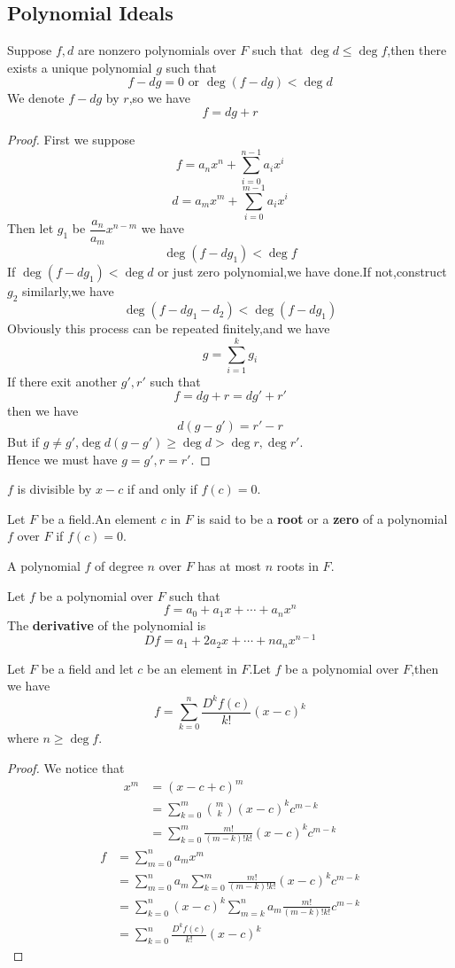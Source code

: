 \documentclass{article}
\begin{document}
\subsection{Polynomial Ideals}
\begin{thm}
	Suppose $f,d$ are nonzero polynomials over $F$ such that $\deg d\le\deg f$,then there exists a unique polynomial $g$ such that
	\[f-dg=0\text{ or }\deg(f-dg)<\deg d\]
	We denote $f-dg$ by $r$,so we have
	\[f=dg+r\]
\end{thm}
\begin{proof}
	First we suppose
	\[f=a_nx^n+\sum\limits_{i=0}^{n-1}a_ix^i\]
	\[d=a_mx^m+\sum\limits_{i=0}^{m-1}a_ix^i\]
	Then let $g_1$ be $\dfrac{a_n}{a_m}x^{n-m}$ we have
	\[\deg(f-dg_1)<\deg f\]
	If $\deg(f-dg_1)<\deg d$ or just zero polynomial,we have done.If not,construct $g_2$ similarly,we have
	\[\deg(f-dg_1-d_2)<\deg(f-dg_1)\]
	Obviously this process can be repeated finitely,and we have
	\[g=\sum\limits_{i=1}^kg_i\]
	If there exit another $g',r'$ such that
	\[f=dg+r=dg'+r'\]
	then we have
	\[d(g-g')=r'-r\]
	But if $g\neq g'$,$\deg d(g-g')\ge\deg d>\deg r,\deg r'$.\\
	Hence we must have $g=g',r=r'$.
\end{proof}
\begin{coro}
	$f$ is divisible by $x-c$ if and only if $f(c)=0$.
\end{coro}
\begin{dde}
	Let $F$ be a field.An element $c$ in $F$ is said to be a \textbf{root} or a \textbf{zero} of a polynomial $f$ over $F$ if $f(c)=0$.
\end{dde}
\begin{coro}
	A polynomial $f$ of degree $n$ over $F$ has at most $n$ roots in $F$. 
\end{coro}
\begin{dde}
	Let $f$ be a polynomial over $F$ such that
	\[f=a_0+a_1x+\cdots+a_nx^n\]
	The \textbf{derivative} of the polynomial is
	\[Df=a_1+2a_2x+\cdots+na_nx^{n-1}\]
\end{dde}
\begin{thm}
	Let $F$ be a field and let $c$ be an element in $F$.Let $f$ be a polynomial over $F$,then we have
	\[f=\sum\limits_{k=0}^n\frac{D^kf(c)}{k!}(x-c)^k\]
	where $n\ge\deg f$.
\end{thm}
\begin{proof}
	We notice that
	\begin{align*}
		x^m&=(x-c+c)^m\\
		&=\sum\limits_{k=0}^m\binom{m}{k}(x-c)^kc^{m-k}\\
		&=\sum\limits_{k=0}^m\frac{m!}{(m-k)!k!}(x-c)^kc^{m-k}
	\end{align*}
	\begin{align*}
		f&=\sum\limits_{m=0}^na_mx^m\\
		&=\sum\limits_{m=0}^na_m\sum\limits_{k=0}^m\frac{m!}{(m-k)!k!}(x-c)^kc^{m-k}\\
		&=\sum\limits_{k=0}^n(x-c)^k\sum\limits_{m=k}^na_m\frac{m!}{(m-k)!k!}c^{m-k}\\
		&=\sum\limits_{k=0}^n\frac{D^kf(c)}{k!}(x-c)^k
	\end{align*}
\end{proof}
\end{document}
